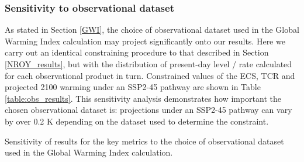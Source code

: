 \documentclass[gmd, manuscript]{copernicus}
\begin{document}
\subsubsection{Sensitivity to observational dataset} \label{obsv_data_sensitivity}
As stated in Section \ref{GWI}, the choice of observational dataset used in the Global Warming Index calculation may project significantly onto our results. Here we carry out an identical constraining procedure to that described in Section \ref{NROY_results}, but with the distribution of present-day level / rate calculated for each observational product in turn. Constrained values of the ECS, TCR and projected 2100 warming under an SSP2-45 pathway are shown in Table \ref{table:obs_results}. This sensitivity analysis demonstrates how important the chosen observational dataset is: projections under an SSP2-45 pathway can vary by over 0.2 K depending on the dataset used to determine the constraint. 
\begin{table}[h]
    \caption{Sensitivity of results for the key metrics to the choice of observational dataset used in the Global Warming Index calculation.}
    \label{table:obs_results}
    {\footnotesize
    
    }
\end{table}
\clearpage
\end{document}

